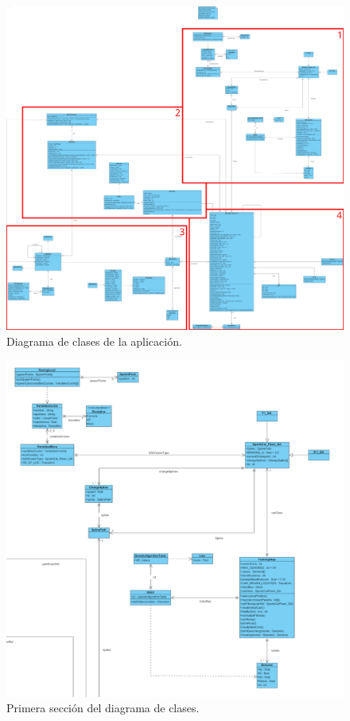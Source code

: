 \begin{figure}[H]
    \centering
    \includegraphics[width=\textwidth]{imagenes/classDiagramSections.png}
    \caption{Diagrama de clases de la aplicación.}
\end{figure}

\begin{figure}[H]
    \centering
    \includegraphics[width=\textwidth]{imagenes/classDiagram1.png}
    \caption{Primera sección del diagrama de clases.}
\end{figure}

